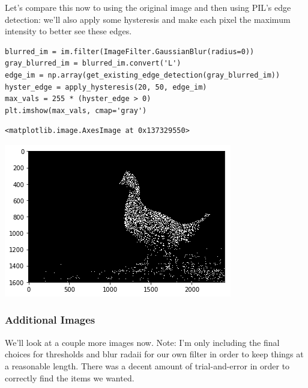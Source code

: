 \documentclass[11pt]{article}
\begin{document}
Let's compare this now to using the original image and then using PIL's edge
detection: we'll also apply some hysteresis and make each pixel the maximum
intensity to better see these edges.

\begin{verbatim}
blurred_im = im.filter(ImageFilter.GaussianBlur(radius=0))
gray_blurred_im = blurred_im.convert('L')
edge_im = np.array(get_existing_edge_detection(gray_blurred_im))
hyster_edge = apply_hysteresis(20, 50, edge_im)
max_vals = 255 * (hyster_edge > 0)
plt.imshow(max_vals, cmap='gray')
\end{verbatim}

\begin{verbatim}
<matplotlib.image.AxesImage at 0x137329550>
\end{verbatim}
\includegraphics[width=.9\linewidth]{./obipy-resources/333cjn.png}

\subsubsection*{Additional Images}
\label{sec-6-1-1}

We'll look at a couple more images now. Note: I'm only including the final
choices for thresholds and blur radaii for our own filter in order to keep
things at a reasonable length. There was a decent amount of trial-and-error in
order to correctly find the items we wanted.
\end{document}
